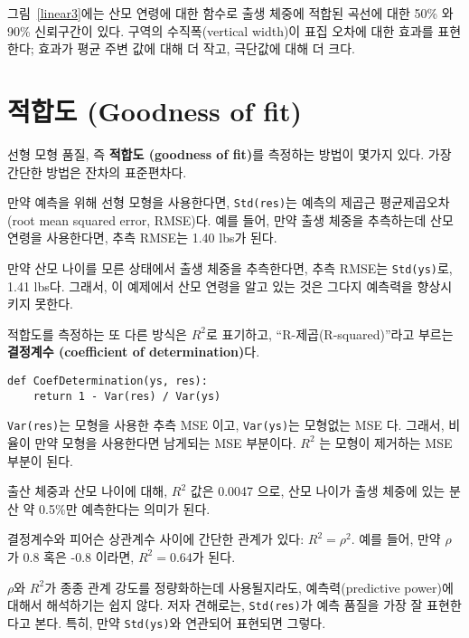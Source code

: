 그림~\ref{linear3}에는 산모 연령에 대한 함수로 출생 체중에 적합된 곡선에 대한 50\% 와 90\% 신뢰구간이 있다. 구역의 수직폭(vertical width)이 표집 오차에 대한 효과를 표현한다; 효과가 평균 주변 값에 대해 더 작고, 극단값에 대해 더 크다.

\section{적합도 (Goodness of fit)}
\label{goodness}

선형 모형 품질, 즉 {\bf 적합도 (goodness of fit)}를 측정하는 방법이 몇가지 있다. 가장 간단한 방법은 잔차의 표준편차다.


만약 예측을 위해 선형 모형을 사용한다면, {\tt Std(res)}는 예측의 제곱근 평균제곱오차(root mean squared error, RMSE)다.
예를 들어, 만약 출생 체중을 추측하는데 산모 연령을 사용한다면, 추측 RMSE는 1.40 lbs가 된다.

만약 산모 나이를 모른 상태에서 출생 체중을 추측한다면, 
추측 RMSE는 {\tt Std(ys)}로, 1.41 lbs다.  
그래서, 이 예제에서 산모 연령을 알고 있는 것은 그다지 예측력을 향상시키지 못한다.

적합도를 측정하는 또 다른 방식은 $R^2$로 표기하고, ``R-제곱(R-squared)''라고 부르는 {\bf 결정계수 (coefficient of determination)}다.


\begin{verbatim}
def CoefDetermination(ys, res):
    return 1 - Var(res) / Var(ys)
\end{verbatim}

{\tt Var(res)}는 모형을 사용한 추측 MSE 이고, {\tt Var(ys)}는 
모형없는 MSE 다. 그래서, 비율이 만약 모형을 사용한다면 남게되는 MSE 부분이다. $R^2$ 는 모형이 제거하는 MSE 부분이 된다.

출산 체중과 산모 나이에 대해, $R^2$ 값은 0.0047 으로, 산모 나이가 출생 체중에 있는 분산 약 0.5\%만 예측한다는 의미가 된다.

결정계수와 피어슨 상관계수 사이에 간단한 관계가 있다: $R^2 = \rho^2$.
예를 들어, 만약 $\rho$ 가 0.8 혹은 -0.8 이라면, $R^2 = 0.64$가 된다.

$\rho$와 $R^2$가 종종 관계 강도를 정량화하는데 사용될지라도,
예측력(predictive power)에 대해서 해석하기는 쉽지 않다.
저자 견해로는, {\tt Std(res)}가 예측 품질을 가장 잘 표현한다고 본다. 특히, 만약 {\tt Std(ys)}와 연관되어 표현되면 그렇다. 

